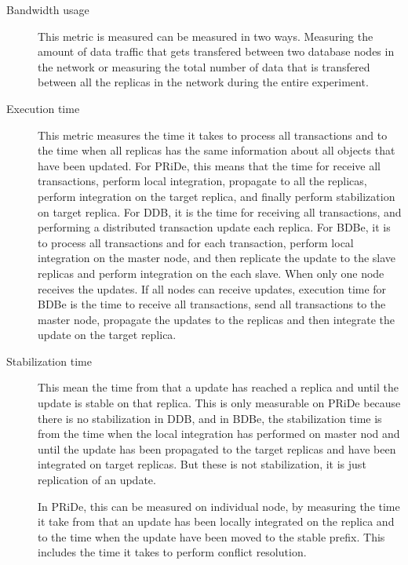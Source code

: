 \begin{description}

	\item[Bandwidth usage]

This metric is measured can be measured in two ways. Measuring the amount of data traffic that gets transfered between two database nodes in the network or measuring the total number of data that is transfered between all the replicas in the network during the entire experiment.

	\item[Execution time]

	This metric measures the time it takes to process all transactions and to the time when all replicas has the same information about all objects that have been updated. For PRiDe, this means that the time for receive all transactions, perform local integration, propagate to all the replicas, perform integration on the target replica, and finally perform stabilization on target replica. For DDB, it is the time for receiving all transactions, and performing a distributed transaction update each replica. For BDBe, it is to process all transactions and for each transaction, perform local integration on the master node, and then replicate the update to the slave replicas and perform integration on the each slave. When only one node receives the updates. If all nodes can receive updates, execution time for BDBe is the time to receive all transactions, send all transactions to the master node, propagate the updates to the replicas and then integrate the update on the target replica.


	\item[Stabilization time]
	This mean the time from that a update has reached a replica and until the update is stable on that replica. This is only measurable on PRiDe because there is no stabilization in DDB, and in BDBe, the stabilization time is from the time when the local integration has performed on master nod and until the update has been propagated to the target replicas and have been integrated on target replicas. But these is not stabilization, it is just replication of an update.

	In PRiDe, this can be measured on individual node, by measuring the time it take from that an update has been locally integrated on the replica and to the time when the update have been moved to the stable prefix. This includes the time it takes to perform conflict resolution. 


\end{description}

